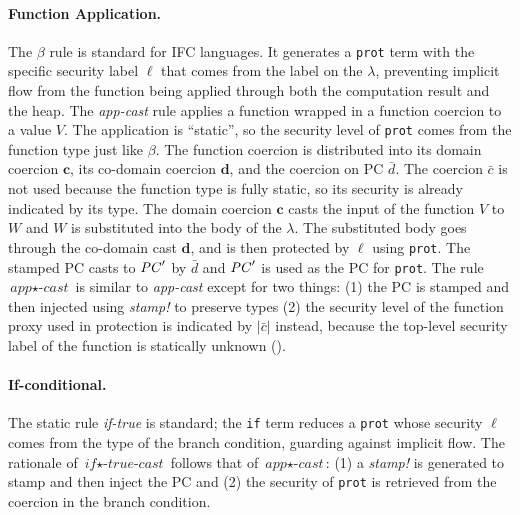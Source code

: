 \paragraph{Function Application.} The $\beta$ rule is standard for IFC languages.
It generates a \texttt{prot} term with the specific security label $\ell$ that
comes from the label on the $\lambda$, preventing implicit
flow from the function being applied through both the computation
result and the heap. The \textit{app-cast} rule applies a function
wrapped in a function coercion to a value $V$. The application is
``static'', so the security level of \texttt{prot} comes from the
function type just like $\beta$. The function coercion is distributed
into its domain coercion $\bm{c}$, its co-domain coercion $\bm{d}$,
and the coercion on PC $\bar{d}$. The coercion $\bar{c}$ is not used
because the function type is fully static, so its security is already
indicated by its type.  The domain coercion $\bm{c}$ casts the input
of the function $V$ to $W$ and $W$ is substituted into the body of the
$\lambda$. The substituted body goes through the co-domain cast
$\bm{d}$, and is then protected by $\ell$ using \texttt{prot}.  The
stamped PC casts to $\mathit{PC}'$ by $\bar{d}$ and $\mathit{PC}'$ is used as the PC
for \texttt{prot}.  The rule $\textit{app}{\star}\textit{-cast}$ is similar
to \textit{app-cast} except for two things: (1) the PC is stamped
and then injected using \textit{stamp!} to preserve types
(2) the security level of the function proxy used in protection is indicated
by $|\bar{c}|$ instead, because the top-level security label of the
function is statically unknown (\unk).

\paragraph{If-conditional.} The static rule \textit{if-true} is standard;
the \texttt{if} term reduces a \texttt{prot} whose security $\ell$
comes from the type of the branch condition, guarding against implicit
flow. The rationale of $\textit{if}{\star}\textit{-true-cast}$ follows that
of $\textit{app}{\star}\textit{-cast}$: (1) a \textit{stamp!} is generated to
stamp and then inject the PC and (2) the security of \texttt{prot} is retrieved
from the coercion in the branch condition.

